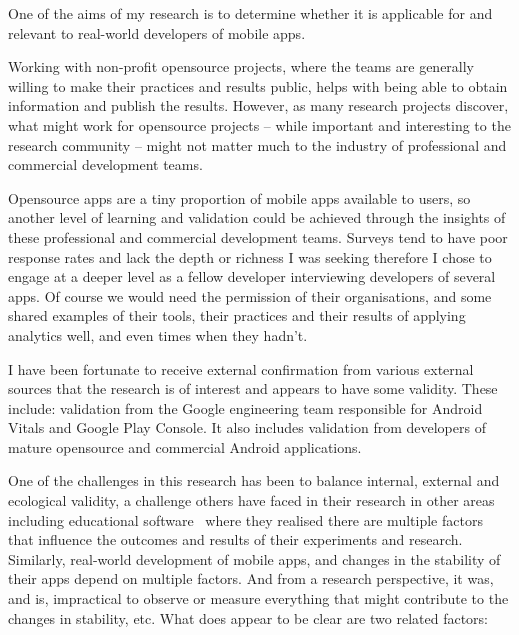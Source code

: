 One of the aims of my research is to determine whether it is applicable for and relevant to real-world developers of mobile apps. 

Working with non-profit opensource projects, where the teams are generally willing to make their practices and results public, helps with being able to obtain information and publish the results. However, as many research projects discover, what might work for opensource projects -- while important and interesting to the research community -- might not matter much to the industry of professional and commercial development teams. 

Opensource apps are a tiny proportion of mobile apps available to users, so another level of learning and validation could be achieved through the insights of these professional and commercial development teams. Surveys tend to have poor response rates and lack the depth or richness I was seeking therefore I chose to engage at a deeper level as a fellow developer interviewing developers of several apps. Of course we would need the permission of their organisations, and some shared examples of their tools, their practices and their results of applying analytics well, and even times when they hadn't.

I have been fortunate to receive external confirmation from various external sources that the research is of interest and appears to have some validity. These include: validation from the Google engineering team responsible for Android Vitals and Google Play Console. It also includes validation from developers of mature opensource and commercial Android applications. 

One of the challenges in this research has been to balance internal, external and ecological validity, a challenge others have faced in their research in other areas including educational software~ where they realised there are multiple factors that influence the outcomes and results of their experiments and research. Similarly, real-world development of mobile apps, and changes in the stability of their apps depend on multiple factors. And from a research perspective, it was, and is, impractical to observe or measure everything that might contribute to the changes in stability, etc. What does appear to be clear are two related factors:

